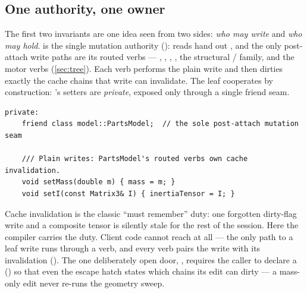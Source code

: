 \subsection{One authority, one owner}\label{sec:philosophy-authority}

The first two invariants are one idea seen from two sides: \emph{who may write} and
\emph{who may hold}.  is the single mutation authority
(): reads hand out , and the only
post-attach write paths are its routed verbs --- , ,
, , the structural / family, and the
motor verbs (\cref{sec:tree}). Each verb performs the plain write and then dirties exactly
the cache chains that write can invalidate. The leaf cooperates by construction: 's
setters are \emph{private}, exposed only through a single friend seam.

\begin{listing}[htbp]
\begin{verbatim}
private:
    friend class model::PartsModel;  // the sole post-attach mutation seam

    /// Plain writes: PartsModel's routed verbs own cache invalidation.
    void setMass(double m) { mass = m; }
    void setI(const Matrix3& I) { inertiaTensor = I; }
\end{verbatim}
\caption{The mutation seam on the leaf (). The setters
carry no invalidation duty and no virtual dispatch; routing and invalidation are entirely the
authority's job.}\label{lst:philosophy-seam}
\end{listing}

\begin{keyinsight}
Cache invalidation is the classic ``must remember'' duty: one forgotten dirty-flag write and a
composite tensor is silently stale for the rest of the session. Here the compiler carries the
duty. Client code cannot reach  at all --- the only path to a leaf write runs
through a  verb, and every verb pairs the write with its invalidation
(). The one deliberately open door, ,
requires the caller to declare a  () so
that even the escape hatch states which chains its edit can dirty --- a mass-only edit never
re-runs the geometry sweep.
\end{keyinsight}

